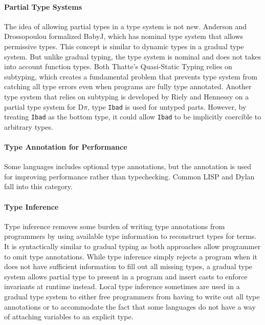 \paragraph{Partial Type Systems}
The idea of allowing partial types in a type system is not new.
Anderson and Drossopoulou formalized BabyJ\cite{anderson2003babyj}, which has
nominal type system that allows permissive types.
This concept is similar to dynamic types in a gradual type system.
But unlike gradual typing, the type system is nominal and does not takes into account function types.
Both Thatte's Quasi-Static Typing\cite{thatte1989quasi} relies on subtyping,
which creates a fundamental problem that prevents type system from catching all type errors even when programs are
fully type annotated.
Another type system that relies on subtyping
is developed by Riely and Hennessy\cite{riely1999trust} on a partial type system for D$\pi$,
type \texttt{Ibad} is used for untyped parts. However, by treating \texttt{Ibad} as the bottom type,
it could allow \texttt{Ibad} to be implicitly coercible to arbitrary types.

\paragraph{Type Annotation for Performance}
Some languages includes optional type annotations, but
the annotation is used for improving performance rather than
typechecking.
Common LISP\cite{steele1982overview}
and Dylan\cite{feinberg1996dylan,shalit1996dylan} fall into this category.

\paragraph{Type Inference}
Type inference \cite{damas1982principal,hindley1969principle,milner1978theory}
removes some burden of writing type annotations from programmers
by using available type information to reconstruct types for terms.
It is syntactically similar to gradual typing as both approaches
allow programmer to omit type annotations.
While type inference simply rejects a program when it
does not have sufficient information to fill out all missing types,
a gradual type system allows partial type to present in a program and insert casts
to enforce invariants at runtime instead.
Local type inference \cite{pierce2000local} sometimes are used in a gradual type
system to either free programmers from having to write out all type annotations
or to accommodate the fact that some languages do not have a way of attaching
variables to an explicit type.

